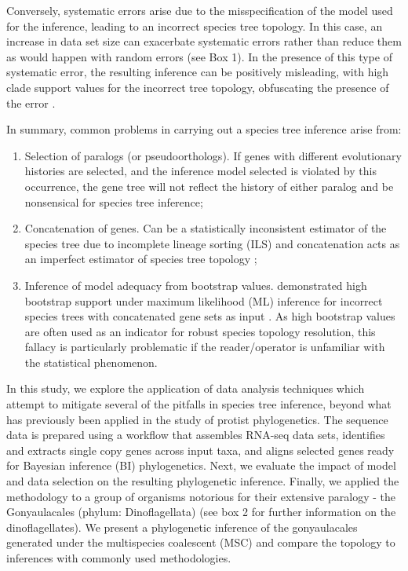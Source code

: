 \documentclass[fleqn,10pt,lineno]{wlpeerj} %
\begin{document}
Conversely, systematic errors arise due to the misspecification of the model used for the inference, leading to an incorrect species tree topology. 
In this case, an increase in data set size can exacerbate systematic errors rather than reduce them as would happen with random errors (see Box 1). 
In the presence of this type of systematic error, the resulting inference can be positively misleading, with high clade support values for the incorrect tree topology, obfuscating the presence of the error \citep{jeffroy2006phylogenomics,roch2015likelihood,kubatko2007inconsistency}. 

In summary, common problems in carrying out a species tree inference arise from:\\
\begin{enumerate}[noitemsep]
\item Selection of paralogs (or pseudoorthologs). 
If genes with different evolutionary histories are selected, and the inference model selected is violated by this occurrence, the gene tree will not reflect the history of either paralog and be nonsensical for species tree inference;
\item Concatenation of genes. 
Can be a statistically inconsistent estimator of the species tree due to incomplete lineage sorting (ILS) and concatenation acts as an imperfect estimator of species tree topology \citep{roch2015likelihood};
\item Inference of model adequacy from bootstrap values. 
\cite{kubatko2007inconsistency} demonstrated high bootstrap support under maximum likelihood (ML) inference for incorrect species trees with concatenated gene sets as input \citep{kubatko2007inconsistency}. 
As high bootstrap values are often used as an indicator for robust species topology resolution, this fallacy is particularly problematic if the reader/operator is unfamiliar with the statistical phenomenon.
\end{enumerate}

In this study, we explore the application of data analysis techniques which attempt to mitigate several of the pitfalls in species tree inference, beyond what has previously been applied in the study of protist phylogenetics.
The sequence data is prepared using a workflow that assembles RNA-seq data sets, identifies and extracts single copy genes across input taxa, and aligns selected genes ready for Bayesian inference (BI) phylogenetics.
Next, we evaluate the impact of model and data selection on the resulting phylogenetic inference. 
Finally, we applied the methodology to a group of organisms notorious for their extensive paralogy - the Gonyaulacales (phylum: Dinoflagellata) (see box 2 for further information on the dinoflagellates).
We present a phylogenetic inference of the gonyaulacales generated under the multispecies coalescent (MSC) and compare the topology to inferences with commonly used methodologies.
\end{document}
